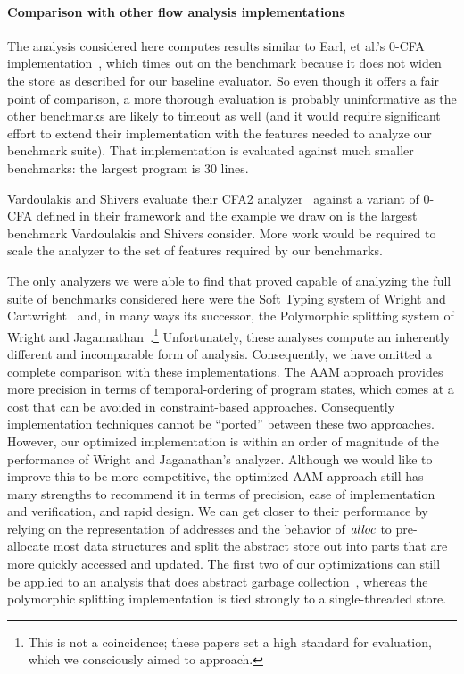 \documentclass[preprint,onecolumn,9pt]{sigplanconf} %
\begin{document}
\paragraph{Comparison with other flow analysis implementations}

The analysis considered here computes results similar to Earl, et al.'s
0-CFA implementation~\cite{dvanhorn:Earl2012Introspective}, which
times out on the \Church{} benchmark because it does not widen the
store as described for our baseline evaluator.  So even though it
offers a fair point of comparison, a more thorough evaluation is
probably uninformative as the other benchmarks are likely to timeout
as well (and it would require significant effort to extend their
implementation with the features needed to analyze our benchmark
suite).  That implementation is evaluated against much smaller
benchmarks: the largest program is 30 lines.

Vardoulakis and Shivers evaluate their CFA2
analyzer~\cite{dvanhorn:Vardoulakis2011CFA2} against a variant of
0-CFA defined in their framework and the example we draw on is the
largest benchmark Vardoulakis and Shivers consider.  More work would
be required to scale the analyzer to the set of features required by
our benchmarks.

The only analyzers we were able to find that proved capable of
analyzing the full suite of benchmarks considered here were the Soft
Typing system of Wright and
Cartwright~\cite{dvanhorn:Wright1997Practical} and, in many ways its
successor, the Polymorphic splitting system of Wright and
Jagannathan~\cite{dvanhorn:wright-jagannathan-toplas98}.\footnote{This
  is not a coincidence; these papers set a high standard for
  evaluation, which we consciously aimed to approach.}  Unfortunately,
these analyses compute an inherently different and incomparable form
of analysis.  Consequently, we have omitted a complete comparison with
these implementations.  The AAM approach provides more precision in
terms of temporal-ordering of program states, which comes at a cost
that can be avoided in constraint-based approaches.  Consequently
implementation techniques cannot be ``ported'' between these two
approaches.  However, our optimized implementation is within an order
of magnitude of the performance of Wright and Jaganathan's analyzer.
Although we would like to improve this to be more competitive, the
optimized AAM approach still has many strengths to recommend it in
terms of precision, ease of implementation and verification, and rapid
design. We can get closer to their performance by relying on the
representation of addresses and the behavior of $\mathit{alloc}$ to
pre-allocate most data structures and split the abstract store out
into parts that are more quickly accessed and updated. The first two
of our optimizations can still be applied to an analysis that does
abstract garbage collection~\cite{dvanhorn:Might:2006:GammaCFA},
whereas the polymorphic splitting implementation is tied strongly to a
single-threaded store.
\end{document}
